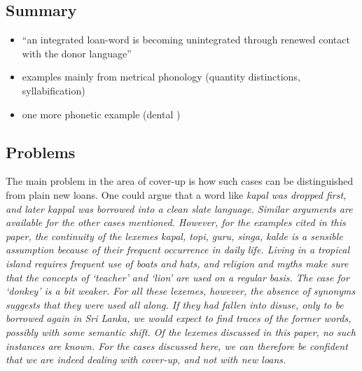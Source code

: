 \documentclass[a4paper,10pt]{article}
\begin{document}
\subsection{Summary} 
\begin{itemize}
 \item ``an integrated loan-word is becoming unintegrated through renewed contact with the donor language''
 \item examples mainly from metrical phonology (quantity distinctions, syllabification)
 \item one more phonetic example (dental {\dentd})
\end{itemize} 

\subsection{Problems} 
The main problem in the area of cover-up is how such cases can be distinguished from plain new loans. One could argue that a word like \em kapal \em was dropped first, and later \em kappal \em was borrowed into a clean slate language. Similar arguments are available for the other cases mentioned. However, for the examples cited in this paper, the continuity of the lexemes \em kapal, topi, guru, singa, kalde \em is a sensible assumption because of their frequent occurrence in daily life. Living in a tropical island requires frequent use of boats and hats, and religion and myths make sure that the concepts of `teacher' and `lion' are used on a regular basis. The case for `donkey' is a bit weaker. For all these lexemes, however, the absence of synonyms suggests that they were used all along. If they had fallen into disuse, only to be borrowed again in Sri Lanka, we would expect to find traces of the former words, possibly with some semantic shift. Of the lexemes discussed in this paper, no such instances are known. For the cases discussed here, we can therefore be confident that we are indeed dealing with cover-up, and not with new loans. 
\end{document}
